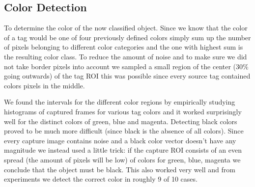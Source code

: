 \subsection{Color Detection}
To determine the color of the now classified object. Since we know that the color of a tag would be one of four previously defined colors simply sum up the number of pixels belonging to different color categories and the one with highest sum is the resulting color class. To reduce the amount of noise and to make sure we did not take border pixels into account we sampled a small region of the center (30\% going outwards) of the tag ROI this was possible since every source tag contained colors pixels in the middle.

We found the intervals for the different color regions by empirically studying histograms of captured frames for various tag colors and it worked surprisingly well for the distinct colors of green, blue and magenta. Detecting black colors proved to be much more difficult (since black is the absence of all colors). Since every capture image contains noise and a black color vector doesn't have any magnitude we instead used a little trick: if the capture ROI consists of an even spread (the amount of pixels will be low) of colors for green, blue, magenta we conclude that the object must be black. This also worked very well and from experiments we detect the correct color in roughly 9 of 10 cases.